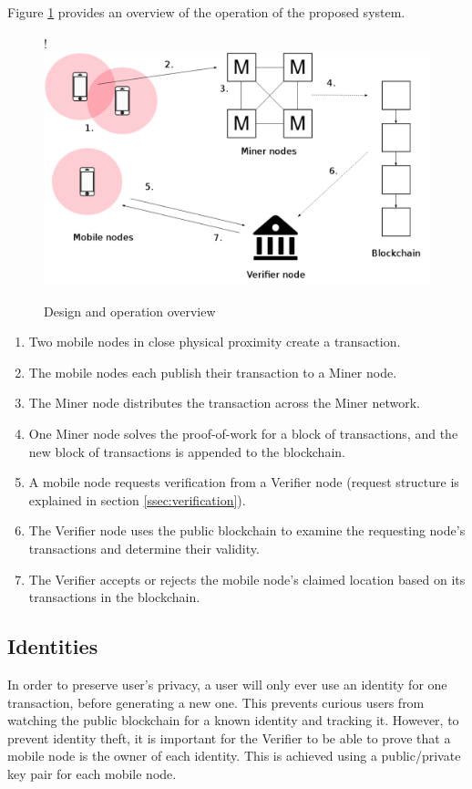\documentclass[12pt]{article}
\begin{document}
Figure \ref{fig:overview} provides an overview of the operation of the proposed system.


\begin{figure}[H]
\begin{center}
\resizebox {\columnwidth} {!} {\includegraphics{diagrams/overview.png}}
\caption{Design and operation overview}
\label{fig:overview}
\end{center}
\end{figure}

\begin{enumerate}[label=\textbf{\arabic*}.]
\item Two mobile nodes in close physical proximity create a transaction.
\item The mobile nodes each publish their transaction to a Miner node.
\item The Miner node distributes the transaction across the Miner network.
\item One Miner node solves the proof-of-work for a block of transactions, and the new block of transactions is appended to the blockchain.
\item A mobile node requests verification from a Verifier node (request structure is explained in section \ref{ssec:verification}).
\item The Verifier node uses the public blockchain to examine the requesting node's transactions and determine their validity.
\item The Verifier accepts or rejects the  mobile node's claimed location based on its transactions in the blockchain. 
\end{enumerate}

\subsection{Identities}
In order to preserve user's privacy, a user will only ever use an identity for one transaction, before generating a new one. This prevents curious users from watching the public blockchain for a known identity and tracking it. However, to prevent identity theft, it is important for the Verifier to be able to prove that a mobile node is the owner of each identity. This is achieved using a public/private key pair for each mobile node.
\end{document}
